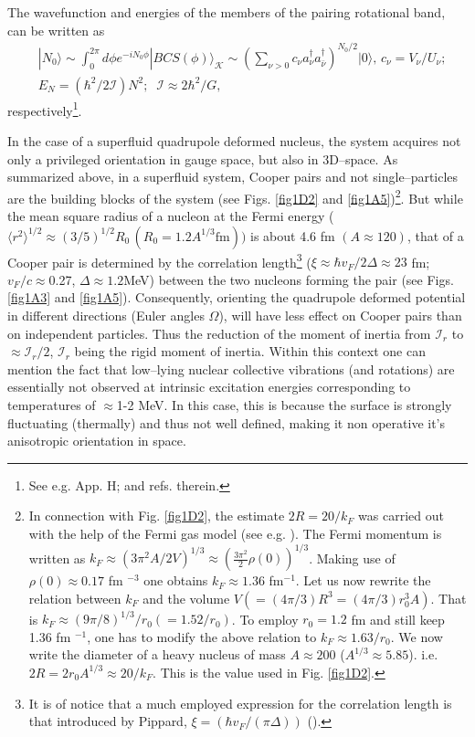 The wavefunction and energies of the members of the pairing rotational band, can be written as  
\begin{equation*}
\begin{split}
&|N_0\rangle\sim\int_0^{2\pi}d\phi e^{-iN_0\phi}|BCS(\phi)\rangle_{\mathcal K}\sim\left(\sum_{\nu>0}c_\nu a_\nu^\dagger a_{\bar{\nu}}^\dagger\right)^{N_0/2}|0\rangle,\,c_\nu=V_\nu/U_\nu;\\
&E_N=(\hbar^2/2\mathcal{I})N^2 ;\;\;\mathcal{I}\approx 2\hbar^2/G,
\end{split}
\end{equation*}
respectively\footnote{See e.g. \cite{Brink:05} App. H; \cite{Mottelson:02} and refs. therein.}.

In the case of a superfluid quadrupole deformed nucleus, the system acquires not only a privileged orientation in gauge space, but also in 3D--space. As summarized above, in a superfluid system, Cooper pairs and not single--particles are the building blocks of the system (see Figs. \ref{fig1D2} and \ref{fig1A5})\footnote{In connection with Fig. \ref{fig1D2}, the estimate $2R=20/k_F$ was carried out with the help of the Fermi gas model (see e.g. \cite{Bohr:69}). The Fermi momentum is written as $k_F\approx (3\pi^2 A/2V)^{1/3}\approx (\frac{3\pi^2}{2}\rho(0))^{1/3}$. Making use of $\rho(0)\approx 0.17$ fm $^{-3}$ one obtains $k_F\approx 1.36 $ fm$^{-1}$. Let us now rewrite the relation between $k_F$ and the volume $V(=(4\pi/3) R^3=(4\pi/3) r_0^3 A)$. That is $k_F\approx (9\pi/8)^{1/3}/r_0(=1.52/r_0)$. To employ $r_0=1.2$ fm and still keep 1.36 fm $^{-1}$, one has to modify the above relation to $k_F\approx 1.63/r_0$. We now write the diameter of a heavy nucleus of mass $A\approx 200$ ($A^{1/3}\approx 5.85$). i.e. $2R=2r_0A^{1/3}\approx 20/k_F$.
 This is the value used in Fig. \ref{fig1D2}.}. But while the mean square radius of a nucleon at the Fermi energy ($\langle r^2\rangle^{1/2}\approx (3/5)^{1/2}R_0 \,(R_0=1.2 A^{1/3}\text{fm}))$ is about 4.6 fm $(A\approx 120)$, that of a Cooper pair is determined by the correlation length\footnote{It is of notice that a much employed expression for the correlation length is that introduced by Pippard, $\xi=\left(\hbar v_F/(\pi\Delta)\right)$ (\cite{Schrieffer:64}).} ($\xi\approx\hbar v_F/2\Delta\approx 23$ fm; $v_F/c\approx$0.27, $\Delta\approx1.2$MeV) between the two nucleons forming the pair (see Figs. \ref{fig1A3} and \ref{fig1A5}). Consequently, orienting the quadrupole deformed potential in different directions (Euler angles $\Omega$), will have  less  effect on Cooper pairs than on independent particles. Thus the reduction of the moment of inertia from $\mathcal I_r$ to $\approx\mathcal{I}_r/2$, $\mathcal{I}_r$ being the rigid moment of inertia. Within this context one can mention the fact that low--lying nuclear collective vibrations (and rotations) are essentially not observed at intrinsic excitation energies corresponding to temperatures of $\approx$1-2 MeV. In this case, this is because the surface is strongly fluctuating (thermally) and thus not well defined, making it non operative it's anisotropic orientation in space.
